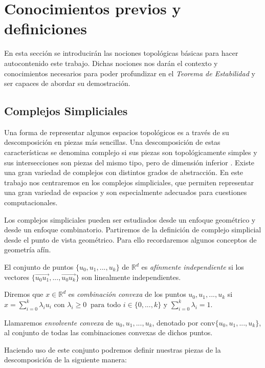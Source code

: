 
\section{Conocimientos previos y definiciones}
En esta sección se introducirán las nociones topológicas básicas para hacer autocontenido este trabajo. Dichas nociones nos darán el contexto y conocimientos necesarios para poder profundizar en el \emph{Teorema de Estabilidad} y ser capaces de abordar su demostración.

\subsection{Complejos Simpliciales}
Una forma de representar algunos espacios topológicos es a través de su descomposición en piezas más sencillas. Una descomposición de estas características se denomina complejo si sus piezas son topológicamente simples y sus intersecciones son piezas del mismo tipo, pero de dimensión inferior \cite{libroEH}. Existe una gran variedad de complejos con distintos grados de abstracción. En este trabajo nos centraremos en los complejos simpliciales, que permiten representar una gran variedad de espacios y son especialmente adecuados para cuestiones computacionales.

Los complejos simpliciales pueden ser estudiados desde un enfoque geométrico y desde un enfoque combinatorio. Partiremos de la definición de complejo simplicial desde el punto de vista geométrico. Para ello recordaremos algunos conceptos de geometría afín.

\begin{definition}
El conjunto de puntos $\{u_0, u_1, ..., u_k\}$ de $\mathbb{R}^d$ es \emph{afínmente independiente} si los vectores $\{\overrightarrow{u_0u_1}, ..., \overrightarrow{u_0u_k}\}$ son linealmente independientes.
\end{definition}

\begin{definition}
\begin{sloppypar}
Diremos que $x \in \mathbb{R}^d$ es \emph{combinación convexa} de los puntos ${u_0, u_1, ..., u_k}$ si $x = \sum_{i=0}^{k} \lambda_i u_i$ con $\lambda_i \geq 0 \ \text{ para todo } i \in \{0,...,k\}$ y $\sum_{i=0}^{k} \lambda_i = 1$.
\end{sloppypar}
\end{definition}

\begin{definition}
\begin{sloppypar}
Llamaremos \emph{envolvente convexa} de $u_0, u_1, ..., u_k$, denotado por ${\text{conv}\{u_0, u_1, ..., u_k\}}$, al conjunto de todas las combinaciones convexas de dichos puntos.
\end{sloppypar}
\end{definition}
Haciendo uso de este conjunto podremos definir nuestras piezas de la descomposición de la siguiente manera:

